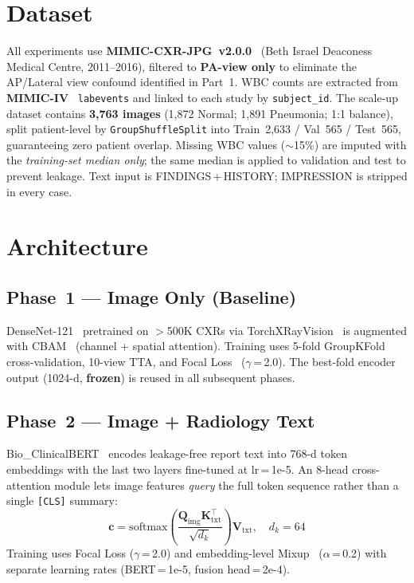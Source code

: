 \documentclass{article}
\begin{document}
\section{Dataset}

All experiments use \textbf{MIMIC-CXR-JPG~v2.0.0}~\cite{johnson2019mimic}
(Beth Israel Deaconess Medical Centre, 2011--2016), filtered to
\textbf{PA-view only} to eliminate the AP/Lateral view confound identified
in Part~1. WBC counts are extracted from \textbf{MIMIC-IV}~\cite{johnson2023mimiciv}
\texttt{labevents} and linked to each study by \texttt{subject\_id}.
The scale-up dataset contains \textbf{3,763 images} (1,872 Normal; 1,891 Pneumonia;
1:1 balance), split patient-level by \texttt{GroupShuffleSplit} into
Train~2,633 / Val~565 / Test~565, guaranteeing zero patient overlap.
Missing WBC values ($\sim$15\%) are imputed with the \emph{training-set median only};
the same median is applied to validation and test to prevent leakage.
Text input is FINDINGS\,+\,HISTORY; IMPRESSION is stripped in every case.

\section{Architecture}

\subsection{Phase~1 — Image Only (Baseline)}

DenseNet-121~\cite{huang2017densenet} pretrained on $>$500K CXRs via
TorchXRayVision~\cite{cohen2022torchxrayvision} is augmented with
CBAM~\cite{woo2018cbam} (channel + spatial attention).
Training uses 5-fold GroupKFold cross-validation, 10-view TTA, and
Focal Loss~\cite{lin2017focal} ($\gamma$\,=\,2.0).
The best-fold encoder output (1024-d, \textbf{frozen}) is reused in all subsequent phases.

\subsection{Phase~2 — Image + Radiology Text}

Bio\_ClinicalBERT~\cite{alsentzer2019bert} encodes leakage-free report text
into 768-d token embeddings with the last two layers fine-tuned at lr\,=\,1e-5.
An 8-head cross-attention module lets image features \emph{query} the full
token sequence rather than a single \texttt{[CLS]} summary:
\vspace{-2pt}
\begin{equation}
  \mathbf{c} = \mathrm{softmax}\!\left(\frac{\mathbf{Q}_{\mathrm{img}}
  \mathbf{K}_{\mathrm{txt}}^\top}{\sqrt{d_k}}\right)\mathbf{V}_{\mathrm{txt}},
  \quad d_k = 64
  \label{eq:crossattn}
\end{equation}
Training uses Focal Loss ($\gamma$\,=\,2.0) and embedding-level
Mixup~\cite{zhang2018mixup} ($\alpha$\,=\,0.2) with separate learning rates
(BERT\,=\,1e-5, fusion head\,=\,2e-4).
\end{document}
